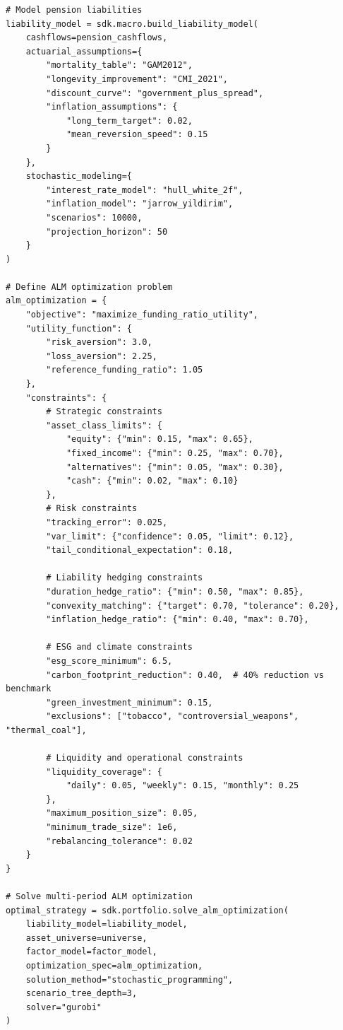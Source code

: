 \documentclass[12pt,a4paper]{article}
\theoremstyle{definition}
\theoremstyle{remark}
\begin{document}
\begin{lstlisting}[caption=Liability-Driven Investment Optimization]
# Model pension liabilities
liability_model = sdk.macro.build_liability_model(
    cashflows=pension_cashflows,
    actuarial_assumptions={
        "mortality_table": "GAM2012",
        "longevity_improvement": "CMI_2021",
        "discount_curve": "government_plus_spread",
        "inflation_assumptions": {
            "long_term_target": 0.02,
            "mean_reversion_speed": 0.15
        }
    },
    stochastic_modeling={
        "interest_rate_model": "hull_white_2f",
        "inflation_model": "jarrow_yildirim",
        "scenarios": 10000,
        "projection_horizon": 50
    }
)

# Define ALM optimization problem
alm_optimization = {
    "objective": "maximize_funding_ratio_utility",
    "utility_function": {
        "risk_aversion": 3.0,
        "loss_aversion": 2.25,
        "reference_funding_ratio": 1.05
    },
    "constraints": {
        # Strategic constraints
        "asset_class_limits": {
            "equity": {"min": 0.15, "max": 0.65},
            "fixed_income": {"min": 0.25, "max": 0.70},
            "alternatives": {"min": 0.05, "max": 0.30},
            "cash": {"min": 0.02, "max": 0.10}
        },
        # Risk constraints
        "tracking_error": 0.025,
        "var_limit": {"confidence": 0.05, "limit": 0.12},
        "tail_conditional_expectation": 0.18,
        
        # Liability hedging constraints
        "duration_hedge_ratio": {"min": 0.50, "max": 0.85},
        "convexity_matching": {"target": 0.70, "tolerance": 0.20},
        "inflation_hedge_ratio": {"min": 0.40, "max": 0.70},
        
        # ESG and climate constraints
        "esg_score_minimum": 6.5,
        "carbon_footprint_reduction": 0.40,  # 40% reduction vs benchmark
        "green_investment_minimum": 0.15,
        "exclusions": ["tobacco", "controversial_weapons", "thermal_coal"],
        
        # Liquidity and operational constraints
        "liquidity_coverage": {
            "daily": 0.05, "weekly": 0.15, "monthly": 0.25
        },
        "maximum_position_size": 0.05,
        "minimum_trade_size": 1e6,
        "rebalancing_tolerance": 0.02
    }
}

# Solve multi-period ALM optimization
optimal_strategy = sdk.portfolio.solve_alm_optimization(
    liability_model=liability_model,
    asset_universe=universe,
    factor_model=factor_model,
    optimization_spec=alm_optimization,
    solution_method="stochastic_programming",
    scenario_tree_depth=3,
    solver="gurobi"
)
\end{lstlisting}
\end{document}
